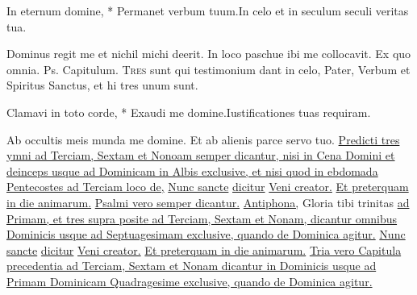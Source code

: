 \begin{multicols*}{2}
\begin{responsory-breve}
{In eternum domine, * Permanet verbum tuum.}{In celo et in seculum seculi veritas tua.}
\end{responsory-breve}
\newline \V Dominus regit me et nichil michi deerit.
\newline \R In loco paschue ibi me collocavit.
 Ex quo omnia. {\color{Red} Ps.}    {\color{Red} Capitulum.}
\lettrine[lines=2]{\zallmancaps \color{Red} T}{res} sunt qui testimonium dant in celo, Pater, Verbum et Spiritus Sanctus, et hi tres unum sunt.
\begin{responsory-breve}
{Clamavi in toto corde, * Exaudi me domine.}{Iustificationes tuas requiram.}
\end{responsory-breve}
\newline \V Ab occultis meis munda me domine.
\newline \R Et ab alienis parce servo tuo.
\newline \ul{Predicti tres ymni ad Terciam, Sextam et Nonoam semper dicantur, nisi in Cena Domini et deinceps usque ad Dominicam in Albis exclusive, et nisi quod in ebdomada Pentecostes ad Terciam loco de,} \hyperlink{nunc-sancte}{Nunc sancte} \ul{dicitur} \hyperlink{veni-creator-spiritus}{Veni creator.} \ul{Et preterquam in die animarum.}
\newline \ul{Psalmi vero semper dicantur.}
\newline \ul{Antiphona,} Gloria tibi trinitas \ul{ad Primam, et tres supra posite ad Terciam, Sextam et Nonam, dicantur omnibus Dominicis usque ad Septuagesimam exclusive, quando de Dominica agitur.} \hyperlink{nunc-sancte}{Nunc sancte} \ul{dicitur} \hyperlink{veni-creator-spiritus}{Veni creator.} \ul{Et preterquam in die animarum.}
\newline \ul{Tria vero Capitula precedentia ad Terciam, Sextam et Nonam dicantur in Dominicis usque ad Primam Dominicam Quadragesime exclusive, quando de Dominica agitur.}

\end{multicols*}
